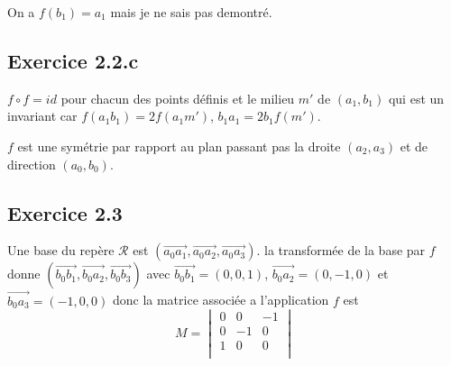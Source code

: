\documentclass[]{book}
\theoremstyle{definition}
\newcommand{\vect}[1]{\overrightarrow{#1}}
\begin{document}
On a $f(b_1) = a_1$ mais je ne sais pas demontr\'e.
  
\subsection*{Exercice 2.2.c}
$f \circ f = id$ pour chacun des points d\'efinis et le milieu $m'$ de $(a_1, b_1)$ qui est un invariant car $f(a_1b_1) = 2f(a_1m')$, $b_1a_1 = 2 b_1f(m')$.

$f$ est une sym\'etrie par rapport au plan passant pas la droite $(a_2, a_3)$ et de direction $(a_0, b_0)$.

\subsection*{Exercice 2.3}
Une base du rep\`ere $\mathcal{R}$ est $(\vect{a_0a_1}, \vect{a_0a_2}, \vect{a_0a_3})$. la transform\'ee de la base par $f$ donne $(\vect{b_0b_1}, \vect{b_0a_2}, \vect{b_0b_3})$ avec $\vect{b_0b_1} = (0,0,1)$, $\vect{b_0a_2} = (0,-1,0)$ et $\vect{b_0a_3} = (-1,0,0)$ donc la matrice associ\'ee a l'application $f$ est
$$
M = \begin{vmatrix}
0 & 0 & -1 \\ 0 & -1 & 0 \\ 1 & 0 & 0 \\
\end{vmatrix}
$$
\end{document}

